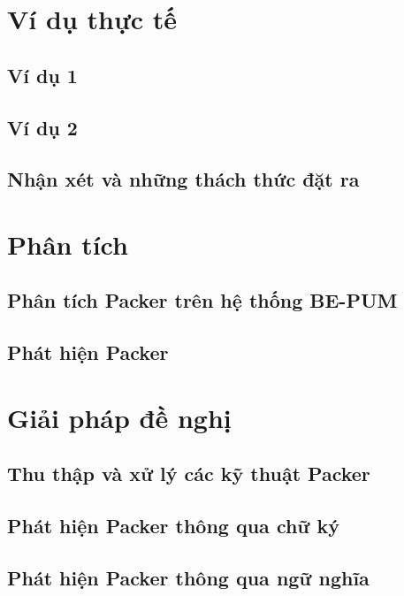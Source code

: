 \section{Ví dụ thực tế}

\subsection{Ví dụ 1}

\subsection{Ví dụ 2}

\subsection{Nhận xét và những thách thức đặt ra}

\section{Phân tích}

\subsection {Phân tích Packer trên hệ thống BE-PUM}

\subsection {Phát hiện Packer}

\section{Giải pháp đề nghị}

\subsection {Thu thập và xử lý các kỹ thuật Packer}

\subsection {Phát hiện Packer thông qua chữ ký}

\subsection {Phát hiện Packer thông qua ngữ nghĩa}